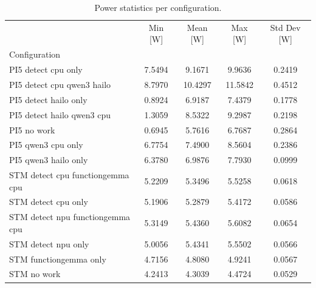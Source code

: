 \begin{table}[H]
\caption{Power statistics per configuration.}
\label{tab:power_stats}
\begin{tabular}{lcccc}
\toprule
 & Min [W] & Mean [W] & Max [W] & Std Dev [W] \\
Configuration &  &  &  &  \\
\midrule
PI5 detect cpu only & 7.5494 & 9.1671 & 9.9636 & 0.2419 \\
PI5 detect cpu qwen3 hailo & 8.7970 & 10.4297 & 11.5842 & 0.4512 \\
PI5 detect hailo only & 0.8924 & 6.9187 & 7.4379 & 0.1778 \\
PI5 detect hailo qwen3 cpu & 1.3059 & 8.5322 & 9.2987 & 0.2198 \\
PI5 no work & 0.6945 & 5.7616 & 6.7687 & 0.2864 \\
PI5 qwen3 cpu only & 6.7754 & 7.4900 & 8.5604 & 0.2386 \\
PI5 qwen3 hailo only & 6.3780 & 6.9876 & 7.7930 & 0.0999 \\
STM detect cpu functiongemma cpu & 5.2209 & 5.3496 & 5.5258 & 0.0618 \\
STM detect cpu only & 5.1906 & 5.2879 & 5.4172 & 0.0586 \\
STM detect npu functiongemma cpu & 5.3149 & 5.4360 & 5.6082 & 0.0654 \\
STM detect npu only & 5.0056 & 5.4341 & 5.5502 & 0.0566 \\
STM functiongemma only & 4.7156 & 4.8080 & 4.9241 & 0.0567 \\
STM no work & 4.2413 & 4.3039 & 4.4724 & 0.0529 \\
\bottomrule
\end{tabular}
\end{table}
